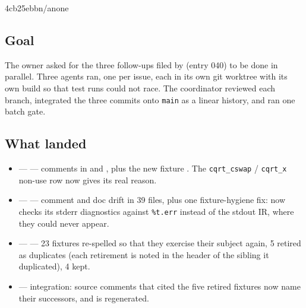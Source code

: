 %
  {4cb25ebb}{n/a}{none}

\subsection*{Goal}
The owner asked for the three follow-ups filed by  (entry 040)
to be done in parallel. Three agents ran, one per issue, each in its own git worktree with
its own build so that test runs could not race. The coordinator reviewed each branch,
integrated the three commits onto \texttt{main} as a linear history, and ran one batch gate.

\subsection*{What landed}
\begin{itemize}
  \item {} ---  --- comments in
   and , plus the new fixture
  . The \texttt{cqrt\_cswap} /
  \texttt{cqrt\_x} non-use row now gives its real reason.
  \item {} ---  --- comment and doc drift in
  39 files, plus one fixture-hygiene fix:
   now checks its stderr diagnostics
  against \texttt{\%t.err} instead of the stdout IR, where they could never appear.
  \item {} ---  --- 23 fixtures re-spelled so
  that they exercise their subject again, 5 retired as duplicates (each retirement is noted
  in the header of the sibling it duplicated), 4 kept.
  \item {} --- integration: source comments that cited the five
  retired fixtures now name their successors, and  is regenerated.
\end{itemize}

